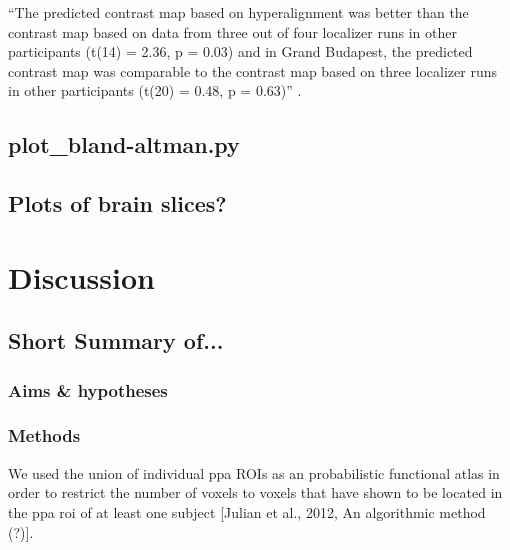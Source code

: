 %
``The predicted contrast map based on hyperalignment was better than the
contrast map based on data from three out of four localizer runs in other
participants (t(14) = 2.36, p = 0.03) and in Grand Budapest, the predicted
contrast map was comparable to the contrast map based on three localizer runs in
other participants (t(20) = 0.48, p = 0.63)''
\citep{jiahui2020predicting}.


\subsection{plot\_bland-altman.py}



\subsection{Plots of brain slices?}






\section{Discussion}


\subsection{Short Summary of...}

\subsubsection{Aims \& hypotheses}

\subsubsection{Methods}

%
We used the union of individual \ac{ppa} ROIs as an probabilistic functional
atlas in order to restrict the number of voxels to voxels that have shown to be
located in the \ac{ppa} \ac{roi} of at least one subject [Julian et al., 2012,
An algorithmic method (?)].




